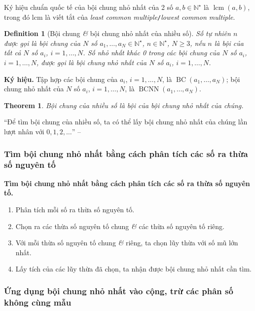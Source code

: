 \documentclass{article}
\numberwithin{equation}{section}
\newtheorem{definition}{Definition}[section]
\newtheorem{theorem}{Theorem}[section]
\begin{document}
Ký hiệu chuẩn quốc tế của bội chung nhỏ nhất của 2 số $a,b\in\mathbb{N}^\star$ là $\operatorname{lcm}(a,b)$, trong đó lcm là viết tắt của \textit{least common multiple}\texttt{/}\textit{lowest common multiple}.

\begin{definition}[Bội chung \textit{\&} bội chung nhỏ nhất của nhiều số]
	Số tự nhiên $n$ được gọi là \emph{bội chung} của $N$ số $a_1,\ldots,a_N\in\mathbb{N}^\star$, $n\in\mathbb{N}^\star$, $N\ge 3$, nếu $n$ là bội của tất cả $N$ số $a_i$, $i = 1,\ldots,N$. Số nhỏ nhất khác 0 trong các bội chung của $N$ số $a_i$, $i = 1,\ldots,N$, được gọi là \emph{bội chung nhỏ nhất} của $N$ số $a_i$, $i = 1,\ldots,N$.
\end{definition}
\noindent\textbf{Ký hiệu.} Tập hợp các bội chung của $a_i$, $i = 1,\ldots,N$, là $\operatorname{BC}(a_1,\ldots,a_N)$; bội chung nhỏ nhất của $N$ số $a_i$, $i = 1,\ldots,N$, là $\operatorname{BCNN}(a_1,\ldots,a_N)$.

\begin{theorem}
	Bội chung của nhiều số là bội của bội chung nhỏ nhất của chúng.
\end{theorem}
``Để tìm bội chung của nhiều số, ta có thể lấy bội chung nhỏ nhất của chúng lần lượt nhân với $0,1,2,\ldots$'' -- \cite[p. 55]{Thai_Anh_Dat_Ha_Loan_Nam_Quang_Toan_6_tap_1}

\subsubsection{Tìm bội chung nhỏ nhất bằng cách phân tích các số ra thừa số nguyên tố}

\begin{tcolorbox}
	\textbf{Tìm bội chung nhỏ nhất bằng cách phân tích các số ra thừa số nguyên tố.}
	\begin{enumerate}
		\item Phân tích mỗi số ra thừa số nguyên tố.
		\item Chọn ra các thừa số nguyên tố chung \textit{\&} các thừa số nguyên tố riêng.
		\item Với mỗi thừa số nguyên tố chung \textit{\&} riêng, ta chọn lũy thừa với số mũ lớn nhất.
		\item Lấy tích của các lũy thừa đã chọn, ta nhận được bội chung nhỏ nhất cần tìm.
	\end{enumerate}
\end{tcolorbox}

\subsubsection{Ứng dụng bội chung nhỏ nhất vào cộng, trừ các phân số không cùng mẫu}
\end{document}

